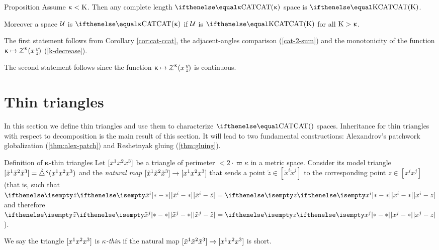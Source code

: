 \begin{thm}{Proposition}
\label{prop:inherit-bound}
Assume $\upkappa<\mathrm{K}$.
Then any complete length $\CAT\kappa$ space is $\CAT\Kappa$.

Moreover a space $\mathcal{U}$ is $\CAT\kappa$ if  $\mathcal{U}$ is $\CAT\Kappa$ for all $\mathrm{K}>\upkappa$.
\end{thm}

 The first statement follows from Corollary \ref{cor:cat-ccat}, the adjacent-angles comparison (\ref{cat-2-sum}) and the monotonicity of the function $\kappa\mapsto\angk\kappa x y z$ (\ref{k-decrease}).

The second statement follows since the function $\kappa\mapsto\angk\kappa x y z$ is continuous.
\qeds


\section{Thin triangles} \label{sec:thin-triangle}

In this section we define thin triangles
and use them to characterize $\CAT{}$ spaces.
Inheritance for thin triangles with respect to decomposition
is the main result of this section.
It will lead to two fundamental constructions:  
Alexandrov's patchwork globalization  (\ref{thm:alex-patch}) 
and Reshetnyak gluing (\ref{thm:gluing}).
 
\begin{thm}{Definition of $\bm\kappa$-thin triangles}\label{def:k-thin}
Let $[{x^1}{x^2}{x^3}]$ be a triangle of perimeter $<2\cdot \varpi\kappa$ in a metric space.
Consider its model triangle
$[{\tilde x^1}{\tilde x^2}{\tilde x^3}]={\tilde\triangle}^{\upkappa}({x^1}{x^2}{x^3})$ 
and the \emph{natural map} $\trig{\tilde x^1}{\tilde x^2}{\tilde x^3}\to \trig{x^1}{x^2}{x^3}$ 
that sends a point $\tilde z\in[\tilde x^i\tilde x^j]$ to the corresponding point $z\in[x^ix^j]$
(that is, such that $\dist{\tilde x^i}{\tilde z}{}=\dist{x^i}{z}{}$ and therefore $\dist{\tilde x^j}{\tilde z}{}=\dist{x^j}{z}{}$).

We say the triangle $[{x^1}{x^2}{x^3}]$ is \emph{$\kappa$-thin} if the natural map $\trig{\tilde x^1}{\tilde x^2}{\tilde x^3}\to \trig{x^1}{x^2}{x^3}$ is short.
\end{thm}

